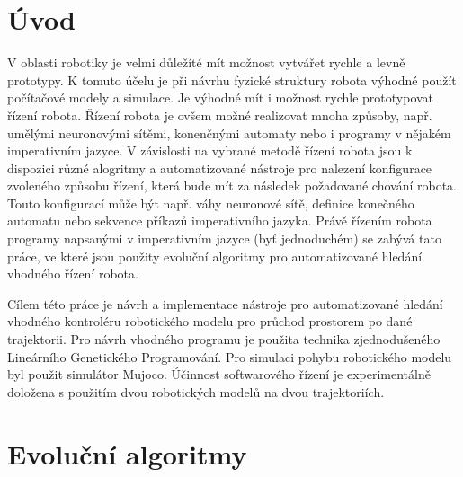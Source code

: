 
\chapter{Úvod}
V oblasti robotiky je velmi důležíté mít možnost vytvářet rychle a levně prototypy.
K tomuto účelu je při návrhu fyzické struktury robota výhodné použít počítačové modely a simulace.
Je výhodné mít i možnost rychle prototypovat řízení robota.
Řízení robota je ovšem možné realizovat mnoha způsoby, např. umělými neuronovými sítěmi, konenčnými automaty nebo i programy v nějakém imperativním jazyce.
V závislosti na vybrané metodě řízení robota jsou k dispozici různé alogritmy a automatizované nástroje pro nalezení konfigurace zvoleného způsobu řízení, která bude mít za následek požadované chování robota.
Touto konfigurací může být např. váhy neuronové sítě, definice konečného automatu nebo sekvence příkazů imperativního jazyka.
Právě řízením robota programy napsanými v imperativním jazyce (byť jednoduchém) se zabývá tato práce, ve které jsou použity evoluční algoritmy pro automatizované hledání vhodného řízení robota.

Cílem této práce je návrh a implementace nástroje pro automatizované hledání vhodného kontroléru robotického modelu pro průchod prostorem po dané trajektorii.
Pro návrh vhodného programu je použita technika zjednodušeného Lineárního Genetického Programování.
Pro simulaci pohybu robotického modelu byl použit simulátor Mujoco.
Účinnost softwarového řízení je experimentálně doložena s použitím dvou robotických modelů na dvou trajektoriích.



\chapter{Evoluční algoritmy}


